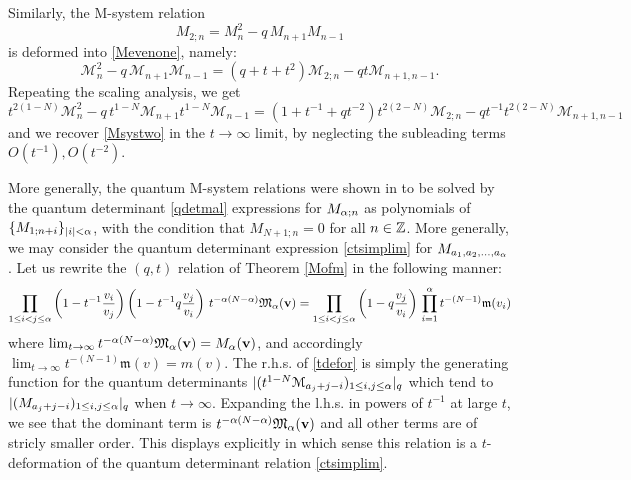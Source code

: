Similarly, the M-system relation 
\begin{equation}\label{Msystwo}
M_{2;n}=M_n^2-q\, M_{n+1}M_{n-1}
\end{equation}
is deformed into \eqref{Mevenone},
namely:
$${\mathcal M}_n^2-q\, {\mathcal M}_{n+1}{\mathcal M}_{n-1}=(q+t+t^2){\mathcal M}_{2;n}-q t {\mathcal M}_{n+1,n-1}.$$
Repeating the scaling analysis, we get
$$ t^{2(1-N)}{\mathcal M}_n^2-q\,  t^{1-N}{\mathcal M}_{n+1} t^{1-N}{\mathcal M}_{n-1}=(1+t^{-1}+q t^{-2}) t^{2(2-N)}{\mathcal M}_{2;n}-q t^{-1}  t^{2(2-N)}{\mathcal M}_{n+1,n-1}$$
and we recover \eqref{Msystwo} in the $t\to\infty$ limit, by neglecting the subleading terms $O(t^{-1}),O(t^{-2})$.

More generally, the quantum M-system relations were shown in \cite{DFK16} to be solved by the quantum determinant
\eqref{qdetmal} expressions for $M_{{\alpha};n}$ as polynomials of $\{M_{1;n+i}\}_{|i|<{\alpha}}$, with the 
condition that $M_{N+1;n}=0$ for all $n\in {\mathbb Z}$. More generally, we may consider the quantum determinant expression \eqref{ctsimplim}
for $M_{a_1,a_2,...,a_{\alpha}}$. Let us rewrite the $(q,t)$ relation of Theorem \ref{Mofm} in the following manner:
\begin{equation}\label{tdefor}
\prod_{1\leq i<j\leq {\alpha}}  \left(1-t^{-1}\frac{v_i}{v_j}\right)\left(1-t^{-1}q \frac{v_j}{v_i}\right) \, t^{-{\alpha}(N-{\alpha})}{\mathfrak M}_{{\alpha}}({\mathbf v})
=\prod_{1\leq i<j\leq {\alpha}}\left(1-q \frac{v_j}{v_i}\right) \, \prod_{i=1}^{\alpha} t^{-(N-1)} {\mathfrak m}(v_i)
\end{equation}
where $\lim_{t\to\infty}t^{-{\alpha}(N-{\alpha})}{\mathfrak M}_{{\alpha}}({\mathbf v})=M_{\alpha}({\mathbf v})$, and accordingly
$\lim_{t\to\infty}t^{-(N-1)}{\mathfrak m}(v)=m(v)$.
The r.h.s. of \eqref{tdefor} is simply the generating function for the quantum determinants 
$\vert (t^{1-N}{\mathcal M}_{a_j+j-i})_{1\leq i,j\leq {\alpha}}\vert_q$ which tend to 
$\vert ({M}_{a_j+j-i})_{1\leq i,j\leq {\alpha}}\vert_q$ when $t\to \infty$.
Expanding the l.h.s. in powers of $t^{-1}$ at large $t$, we see that the dominant term
is $t^{-{\alpha}(N-{\alpha})}{\mathfrak M}_{{\alpha}}({\mathbf v})$ and all other terms are of stricly smaller order. 
This displays explicitly in which sense this
relation is a $t$-deformation of the quantum determinant relation \eqref{ctsimplim}.

